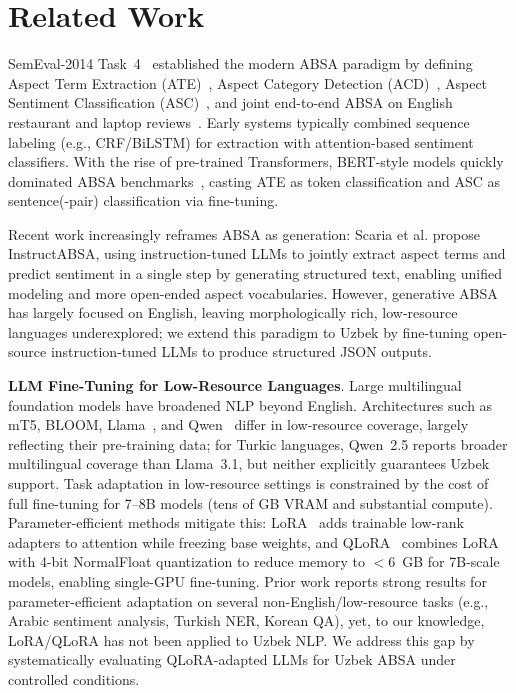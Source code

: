 \documentclass[computers,article,submit,pdftex,moreauthors]{Definitions/mdpi}
\begin{document}

\section{Related Work}
\label{sec:related_work}

SemEval-2014 Task~4~\cite{pontiki-etal-2014-semeval} established the modern ABSA paradigm by defining Aspect Term Extraction (ATE)~\cite{ma-etal-2019-exploring}, Aspect Category Detection (ACD)~\cite{hu-etal-2021-multi-label}, Aspect Sentiment Classification (ASC)~\cite{10.1145/3721844}, and joint end-to-end ABSA on English restaurant and laptop reviews~\cite{Hua2024}. Early systems typically combined sequence labeling (e.g., CRF/BiLSTM) for extraction with attention-based sentiment classifiers. With the rise of pre-trained Transformers, BERT-style models quickly dominated ABSA benchmarks~\cite{ZohrehMadhoushi2019,electronics12030515}, casting ATE as token classification and ASC as sentence(-pair) classification via fine-tuning.

Recent work increasingly reframes ABSA as generation: Scaria et al. \cite{scaria-etal-2024-instructabsa} propose InstructABSA, using instruction-tuned LLMs to jointly extract aspect terms and predict sentiment in a single step by generating structured text, enabling unified modeling and more open-ended aspect vocabularies. However, generative ABSA has largely focused on English, leaving morphologically rich, low-resource languages underexplored; we extend this paradigm to Uzbek by fine-tuning open-source instruction-tuned LLMs to produce structured JSON outputs.%

\textbf{LLM Fine-Tuning for Low-Resource Languages}. Large multilingual foundation models have broadened NLP beyond English. Architectures such as mT5, BLOOM, Llama~\cite{Touvron2023-lf,Grattafiori2024-ka}, and Qwen~\cite{Qwen2024-kr} differ in low-resource coverage, largely reflecting their pre-training data; for Turkic languages, Qwen~2.5 reports broader multilingual coverage than Llama~3.1, but neither explicitly guarantees Uzbek support. Task adaptation in low-resource settings is constrained by the cost of full fine-tuning for 7--8B models (tens of GB VRAM and substantial compute). Parameter-efficient methods mitigate this: LoRA~\cite{10.5555/3666122.3666563} adds trainable low-rank adapters to attention while freezing base weights, and QLoRA~\cite{10.5555/3666122.3666563} combines LoRA with 4-bit NormalFloat quantization to reduce memory to $<6$~GB for 7B-scale models, enabling single-GPU fine-tuning.
Prior work reports strong results for parameter-efficient adaptation on several non-English/low-resource tasks (e.g., Arabic sentiment analysis, Turkish NER, Korean QA), yet, to our knowledge, LoRA/QLoRA has not been applied to Uzbek NLP. We address this gap by systematically evaluating QLoRA-adapted LLMs for Uzbek ABSA under controlled conditions.%
\end{document}
